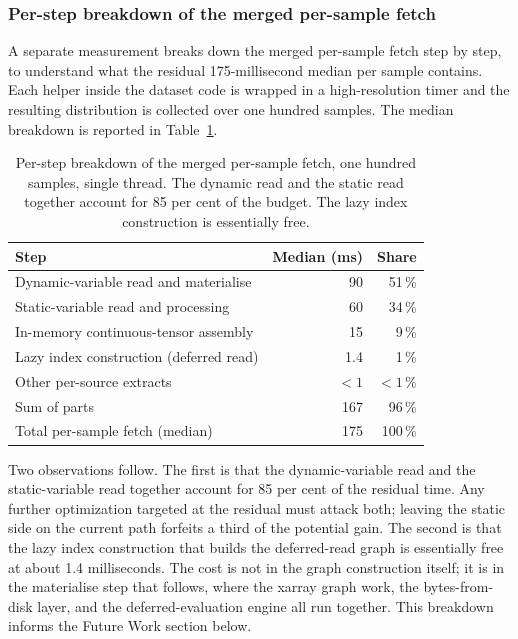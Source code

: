 \documentclass[12pt,a4paper]{article}
\begin{document}
\subsubsection{Per-step breakdown of the merged per-sample fetch}

A separate measurement breaks down the merged per-sample fetch step by step, to
understand what the residual 175-millisecond median per sample contains. Each helper inside
the dataset code is wrapped in a high-resolution timer and the resulting distribution is
collected over one hundred samples. The median breakdown is reported in
Table~\ref{tab:merged-breakdown}.

\begin{table}[ht]
\centering
\small
\begin{tabular}{@{}lrr@{}}
\toprule
\textbf{Step} & \textbf{Median (ms)} & \textbf{Share} \\
\midrule
Dynamic-variable read and materialise          & 90      & 51\,\% \\
Static-variable read and processing             & 60      & 34\,\% \\
In-memory continuous-tensor assembly            & 15      &  9\,\% \\
Lazy index construction (deferred read)         &  1.4    &  1\,\% \\
Other per-source extracts                       & ${<}1$  & ${<}1$\,\% \\
\midrule
Sum of parts                                    & 167     & 96\,\% \\
Total per-sample fetch (median)                 & 175     & 100\,\% \\
\bottomrule
\end{tabular}
\caption{Per-step breakdown of the merged per-sample fetch, one hundred samples, single
thread. The dynamic read and the static read together account for 85 per cent of the
budget. The lazy index construction is essentially free.}
\label{tab:merged-breakdown}
\end{table}

Two observations follow. The first is that the dynamic-variable read and the
static-variable read together account for 85 per cent of the residual time. Any further
optimization targeted at the residual must attack both; leaving the static side on the
current path forfeits a third of the potential gain. The second is that the lazy index
construction that builds the deferred-read graph is essentially free at about 1.4
milliseconds. The cost is not in the graph construction itself; it is in the materialise
step that follows, where the xarray graph work, the bytes-from-disk layer, and the
deferred-evaluation engine all run together. This breakdown informs the Future Work section
below.
\end{document}
